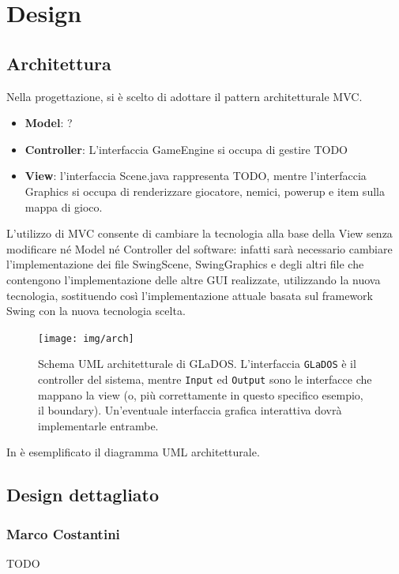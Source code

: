 \documentclass[a4paper,12pt]{report}
\begin{document}
\chapter{Design}
\section{Architettura}
Nella progettazione, si è scelto di adottare il pattern architetturale MVC.
\begin{itemize}
    \item \textbf{Model}: ?
    \item \textbf{Controller}: L'interfaccia GameEngine si occupa di gestire {TODO}
    \item \textbf{View}: l'interfaccia Scene.java rappresenta {TODO}, 
        mentre l'interfaccia Graphics si occupa di renderizzare giocatore, nemici, powerup e item sulla mappa di gioco.
\end{itemize}

L'utilizzo di MVC consente di cambiare la tecnologia alla base della View senza modificare 
né Model né Controller del software:
infatti sarà necessario cambiare l'implementazione dei file SwingScene, SwingGraphics e degli altri file
che contengono l'implementazione delle altre GUI realizzate, utilizzando la nuova tecnologia, 
sostituendo così l'implementazione attuale basata sul framework Swing con la nuova tecnologia scelta.


\begin{figure}[h]
    \centering{}
    \texttt{[image: img/arch]}
    \caption{Schema UML architetturale di GLaDOS. L'interfaccia \texttt{GLaDOS} è il controller del sistema, mentre \texttt{Input} ed \texttt{Output} sono le interfacce che mappano la view (o, più correttamente in questo specifico esempio, il boundary). Un'eventuale interfaccia grafica interattiva dovrà implementarle entrambe.}
    \label{img:goodarch}
\end{figure}


In  è esemplificato il diagramma UML architetturale.


\section{Design dettagliato}

\subsection*{Marco Costantini}
{TODO}
\end{document}
